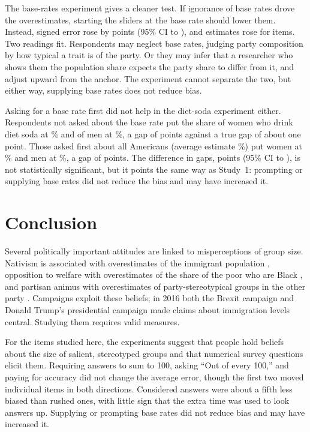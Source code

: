 \documentclass[11pt]{article}
\begin{document}
The base-rates experiment gives a cleaner test. If ignorance of base rates drove the overestimates, starting the sliders at the base rate should lower them. Instead, signed error rose by \brEffect{} points (95\% CI \brLo{} to \brHi), and estimates rose for \brItemsUp{} items. Two readings fit. Respondents may neglect base rates, judging party composition by how typical a trait is of the party. Or they may infer that a researcher who shows them the population share expects the party share to differ from it, and adjust upward from the anchor. The experiment cannot separate the two, but either way, supplying base rates does not reduce bias.

Asking for a base rate first did not help in the diet-soda experiment either. Respondents not asked about the base rate put the share of women who drink diet soda at \sodaNoWomen\% and of men at \sodaNoMen\%, a gap of \sodaNoGap{} points against a true gap of about one point. Those asked first about all Americans (average estimate \sodaYesBase\%) put women at \sodaYesWomen\% and men at \sodaYesMen\%, a gap of \sodaYesGap{} points. The difference in gaps, \sodaDiff{} points (95\% CI \sodaLo{} to \sodaHi), is not statistically significant, but it points the same way as Study~1: prompting or supplying base rates did not reduce the bias and may have increased it.

\section{Conclusion}

Several politically important attitudes are linked to misperceptions of group size. Nativism is associated with overestimates of the immigrant population \citep{alba2005}, opposition to welfare with overestimates of the share of the poor who are Black \citep{gilens1996, gilens1999}, and partisan animus with overestimates of party-stereotypical groups in the other party \citep{ahler2018}. Campaigns exploit these beliefs; in 2016 both the Brexit campaign and Donald Trump's presidential campaign made claims about immigration levels central. Studying them requires valid measures.

For the items studied here, the experiments suggest that people hold beliefs about the size of salient, stereotyped groups and that numerical survey questions elicit them. Requiring answers to sum to 100, asking ``Out of every 100,'' and paying for accuracy did not change the average error, though the first two moved individual items in both directions. Considered answers were about a fifth less biased than rushed ones, with little sign that the extra time was used to look answers up. Supplying or prompting base rates did not reduce bias and may have increased it.
\end{document}
